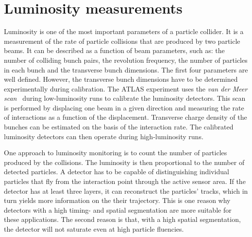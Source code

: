 \section{Luminosity measurements}
\label{sec:lummeas}
 \label{sec:lumi}
Luminosity is one of the most important parameters of a particle collider. It is a measurement of the rate of particle collisions that are produced by two particle beams. It can be described as a function of beam parameters, such as: the number of colliding bunch pairs, the revolution frequency, the number of particles in each bunch and the transverse bunch dimensions. The first four parameters are well defined. However, the transverse bunch dimensions have to be determined experimentally during calibration. The ATLAS experiment uses the \emph{van der Meer scan}~\cite{} during low-luminosity runs to calibrate the luminosity detectors. This scan is performed by displacing one beam in a given direction and measuring the rate of interactions as a function of the displacement. Transverse charge density of the bunches can be estimated on the basis of the interaction rate. The calibrated luminosity detectors can then operate during high-luminosity runs.

One approach to luminosity monitoring is to count the number of particles produced by the collisions. The luminosity is then proportional to the number of detected particles. A detector has to be capable of distinguishing individual particles that fly from the interaction point through the active sensor area. If the detector has at least three layers, it can reconstruct the particles' tracks, which in turn yields more information on the their trajectory. This is one reason why detectors with a high timing- and spatial segmentation are more suitable for these applications. The second reason is that, with a high spatial segmentation, the detector will not saturate even at high particle fluencies.





